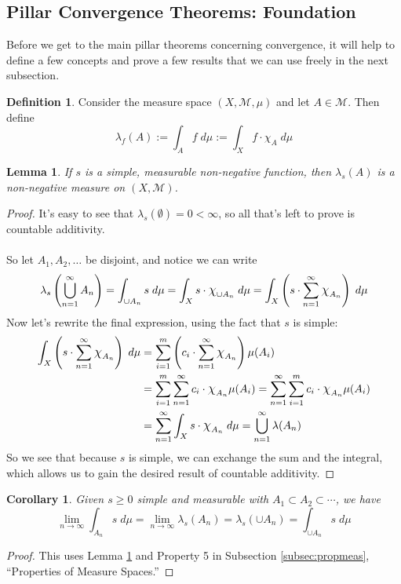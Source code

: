 \documentclass[12pt]{article}
\theoremstyle{plain}
\newtheorem{lem}[thm]{Lemma}
\newtheorem{cor}[thm]{Corollary}
\theoremstyle{definition}
\newtheorem{defn}[thm]{Definition}
\theoremstyle{remark}
\newcommand*{\Chi}{\mbox{\large$\chi$}} %
\begin{document}
\subsection{Pillar Convergence Theorems: Foundation}

Before we get to the main pillar theorems concerning convergence, it will help to define a few concepts and prove a few results that we can use freely in the next subsection.

\begin{defn}
Consider the measure space $(X,\mathscr{M},\mu)$ and let $A\in\mathscr{M}$. Then define
\[
    \lambda_f(A) := \int_A f \; d\mu 
    := \int_X f\cdot\chi_A \;d\mu
\]
\end{defn}

\begin{lem} 
\label{measurelem}
If $s$ is a simple, measurable non-negative function, then $\lambda_s(A)$ is a non-negative measure on $(X,\mathscr{M})$.
\end{lem}
\begin{proof}
It's easy to see that $\lambda_s(\emptyset) = 0<\infty$, so all that's left to prove is countable additivity.
\\
\\
So let $A_1, A_2,\ldots$ be disjoint, and notice we can write
\[
    \lambda_s\left(\bigcup^\infty_{n=1} A_n\right)
    = \int_{\cup A_n} s \;d\mu =
    \int_{X} s \cdot \Chi_{\cup A_n}\;d\mu =
    \int_{X} \left(s \cdot  
    \sum^\infty_{n=1}\Chi_{A_n}\right)\;d\mu 
\]
Now let's rewrite the final expression, using the fact that $s$ is simple:
\begin{align*}
    \int_{X} \left(s \cdot  \sum^\infty_{n=1}
    \Chi_{A_n}\right)\;d\mu 
    &= \sum^m_{i=1} \left(c_i \cdot  
    \sum^\infty_{n=1}\Chi_{A_n} 
    \right)\mu(A_i) \\
    &= \sum^m_{i=1} \sum^\infty_{n=1}c_i \cdot \Chi_{A_n} 
    \mu(A_i)
    =  \sum^\infty_{n=1}\sum^m_{i=1} c_i \cdot \Chi_{A_n} 
    \mu(A_i) \\
    &=   \sum^\infty_{n=1}\int_X s \cdot \Chi_{A_n} 
        \; d\mu =  \bigcup^\infty_{n=1}\lambda(A_n)
\end{align*}
So we see that because $s$ is simple, we can exchange the sum and the integral, which allows us to gain the desired result of countable additivity.
\end{proof}

\begin{cor}
\label{cormtc}
Given $s\geq 0$ simple and measurable with $A_1\subset A_2\subset\cdots$, we have
\[
    \lim_{n\rightarrow\infty} \int_{A_n} s\;d\mu
    = \lim_{n\rightarrow\infty} \lambda_s(A_n) =
    \lambda_s(\cup A_n) 
    = \int_{\cup A_n} s \; d\mu
\]
\end{cor}
\begin{proof}
This uses Lemma \ref{measurelem} and Property 5 in Subsection \ref{subsec:propmeas}, ``Properties of Measure Spaces.''
\end{proof}
\end{document}
